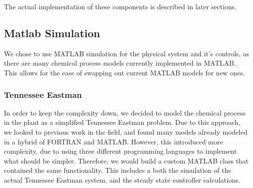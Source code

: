 The actual implementation of these components is described in later sections. 


\subsection{Matlab Simulation}
 We chose to use MATLAB simulation for the physical system and it's controls, as there are many chemical process models currently implemented in MATLAB. This allows for the ease of swapping out current MATLAB models for new ones.

\subsubsection{Tennessee Eastman}
 In order to keep the complexity down, we decided to model the chemical process in the plant as a simplified Tennessee Eastman problem. Due to this approach, we looked to previous work in the field, and found many models already modeled in a hybrid of FORTRAN and MATLAB.  However, this introduced more complexity, due to using three different programming languages to implement what should be simpler.  Therefore, we would build a custom MATLAB class that contained the same functionality.  This includes a both the simulation of the actual Tennessee Eastman system, and the steady state controller calculations.

